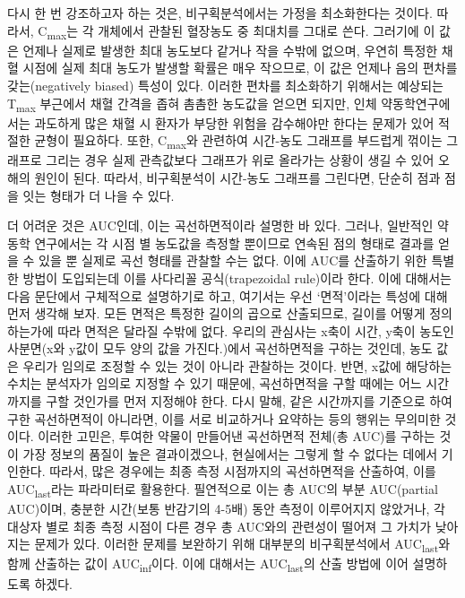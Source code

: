 \documentclass[
  11pt,
  krantz2, a4paper, twoside]{krantz}
\theoremstyle{definition}
\theoremstyle{definition}
\theoremstyle{definition}
\theoremstyle{definition}
\theoremstyle{remark}
\begin{document}
다시 한 번 강조하고자 하는 것은, 비구획분석에서는 가정을 최소화한다는 것이다.
따라서, C\textsubscript{max}는 각 개체에서 관찰된 혈장농도 중 최대치를 그대로 쓴다.
그러기에 이 값은 언제나 실제로 발생한 최대 농도보다 같거나 작을 수밖에 없으며, 우연히 특정한 채혈 시점에 실제 최대 농도가 발생할 확률은 매우 작으므로, 이 값은 언제나 음의 편차를 갖는(negatively biased) 특성이 있다.
이러한 편차를 최소화하기 위해서는 예상되는 T\textsubscript{max} 부근에서 채혈 간격을 좁혀 촘촘한 농도값을 얻으면 되지만, 인체 약동학연구에서는 과도하게 많은 채혈 시 환자가 부당한 위험을 감수해야만 한다는 문제가 있어 적절한 균형이 필요하다.
또한, C\textsubscript{max}와 관련하여 시간-농도 그래프를 부드럽게 꺾이는 그래프로 그리는 경우 실제 관측값보다 그래프가 위로 올라가는 상황이 생길 수 있어 오해의 원인이 된다.
따라서, 비구획분석이 시간-농도 그래프를 그린다면, 단순히 점과 점을 잇는 형태가 더 나을 수 있다.

더 어려운 것은 AUC인데, 이는 곡선하면적이라 설명한 바 있다.
그러나, 일반적인 약동학 연구에서는 각 시점 별 농도값을 측정할 뿐이므로 연속된 점의 형태로 결과를 얻을 수 있을 뿐 실제로 곡선 형태를 관찰할 수는 없다. 
이에 AUC를 산출하기 위한 특별한 방법이 도입되는데 이를 사다리꼴 공식(trapezoidal rule)이라 한다.
이에 대해서는 다음 문단에서 구체적으로 설명하기로 하고, 여기서는 우선 `면적'이라는 특성에 대해 먼저 생각해 보자.
모든 면적은 특정한 길이의 곱으로 산출되므로, 길이를 어떻게 정의하는가에 따라 면적은 달라질 수밖에 없다.
우리의 관심사는 x축이 시간, y축이 농도인 사분면(x와 y값이 모두 양의 값을 가진다.)에서 곡선하면적을 구하는 것인데, 농도 값은 우리가 임의로 조정할 수 있는 것이 아니라 관찰하는 것이다.
반면, x값에 해당하는 수치는 분석자가 임의로 지정할 수 있기 때문에, 곡선하면적을 구할 때에는 어느 시간까지를 구할 것인가를 먼저 지정해야 한다.
다시 말해, 같은 시간까지를 기준으로 하여 구한 곡선하면적이 아니라면, 이를 서로 비교하거나 요약하는 등의 행위는 무의미한 것이다.
이러한 고민은, 투여한 약물이 만들어낸 곡선하면적 전체(총 AUC)를 구하는 것이 가장 정보의 품질이 높은 결과이겠으나, 현실에서는 그렇게 할 수 없다는 데에서 기인한다.
따라서, 많은 경우에는 최종 측정 시점까지의 곡선하면적을 산출하여, 이를 AUC\textsubscript{last}라는 파라미터로 활용한다.
필연적으로 이는 총 AUC의 부분 AUC(partial AUC)이며, 충분한 시간(보통 반감기의 4-5배) 동안 측정이 이루어지지 않았거나, 각 대상자 별로 최종 측정 시점이 다른 경우 총 AUC와의 관련성이 떨어져 그 가치가 낮아지는 문제가 있다. 
이러한 문제를 보완하기 위해 대부분의 비구획분석에서 AUC\textsubscript{last}와 함께 산출하는 값이 AUC\textsubscript{inf}이다.
이에 대해서는 AUC\textsubscript{last}의 산출 방법에 이어 설명하도록 하겠다.
\end{document}
